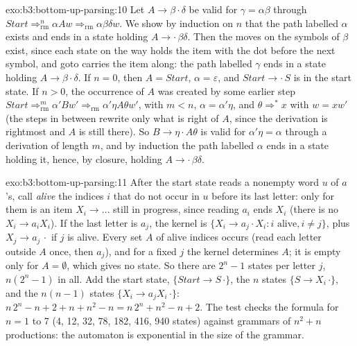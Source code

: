 \begin{solution}{exo:b3:bottom-up-parsing:10}
Let $A \to \beta \cdot \delta$ be valid for $\gamma = \alpha\beta$ through $\mathit{Start} \Rightarrow^n_{\mathrm{rm}} \alpha A w \Rightarrow_{\mathrm{rm}} \alpha\beta\delta w$. We show by induction on $n$ that the path labelled $\alpha$ exists and ends in a state holding $A \to \cdot\,\beta\delta$. Then the moves on the symbols of $\beta$ exist, since each state on the way holds the item with the dot before the next symbol, and goto carries the item along: the path labelled $\gamma$ ends in a state holding $A \to \beta \cdot \delta$. If $n = 0$, then $A = \mathit{Start}$, $\alpha = \varepsilon$, and $\mathit{Start} \to \cdot\,S$ is in the start state. If $n > 0$, the occurrence of $A$ was created by some earlier step $\mathit{Start} \Rightarrow^m_{\mathrm{rm}} \alpha' B w' \Rightarrow_{\mathrm{rm}} \alpha'\eta A \theta w'$, with $m < n$, $\alpha = \alpha'\eta$, and $\theta \Rightarrow^* x$ with $w = x w'$ (the steps in between rewrite only what is right of $A$, since the derivation is rightmost and $A$ is still there). So $B \to \eta \cdot A\theta$ is valid for $\alpha'\eta = \alpha$ through a derivation of length $m$, and by induction the path labelled $\alpha$ ends in a state holding it, hence, by closure, holding $A \to \cdot\,\beta\delta$.
\end{solution}

\begin{solution}{exo:b3:bottom-up-parsing:11}
After the start state reads a nonempty word $u$ of $a$'s, call \emph{alive} the indices $i$ that do not occur in $u$ before its last letter: only for them is an item $X_i \to \dots$ still in progress, since reading $a_i$ ends $X_i$ (there is no $X_i \to a_i X_i$). If the last letter is $a_j$, the kernel is $\{X_i \to a_j \cdot X_i : i \text{ alive}, i \ne j\}$, plus $X_j \to a_j\,\cdot$ if $j$ is alive. Every set $A$ of alive indices occurs (read each letter outside $A$ once, then $a_j$), and for a fixed $j$ the kernel determines $A$; it is empty only for $A = \emptyset$, which gives no state. So there are $2^n - 1$ states per letter $j$, $n(2^n - 1)$ in all. Add the start state, $\{\mathit{Start} \to S\,\cdot\}$, the $n$ states $\{S \to X_i\,\cdot\}$, and the $n(n-1)$ states $\{X_i \to a_j X_i\,\cdot\}$: $n\,2^n - n + 2 + n + n^2 - n = n\,2^n + n^2 - n + 2$. The test checks the formula for $n = 1$ to 7 (4, 12, 32, 78, 182, 416, 940 states) against grammars of $n^2 + n$ productions: the automaton is exponential in the size of the grammar.
\end{solution}

